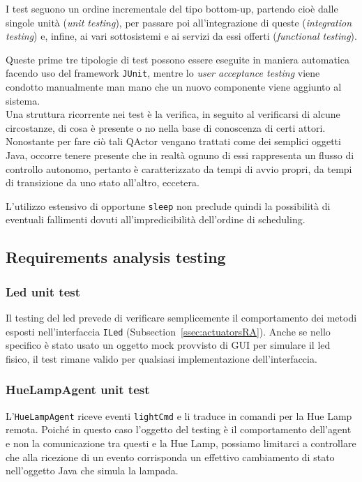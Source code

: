 \documentclass{../llncs}
\newcommand{\codescript}[1]{{\mbox{\small{\texttt{#1}}}}\xspace}
\newcommand{\xss}[1]{\subsectionname~\ref{ssec:#1}}
\newcommand{\labelsssec}[1]{\label{sssec:#1}}
\newcommand{\subsectionname}{Subsection}
\begin{document}
I test seguono un ordine incrementale del tipo bottom-up, partendo cioè dalle singole unità (\emph{unit testing}), per passare poi all'integrazione di queste (\emph{integration testing}) e, infine, ai vari sottosistemi e ai servizi da essi offerti (\emph{functional testing}).

Queste prime tre tipologie di test possono essere eseguite in maniera automatica facendo uso del framework \texttt{JUnit}, mentre lo \emph{user acceptance testing} viene condotto manualmente man mano che un nuovo componente viene aggiunto al sistema.\\

Una struttura ricorrente nei test è la verifica, in seguito al verificarsi di alcune circostanze, di cosa è presente o no nella base di conoscenza di certi attori. Nonostante per fare ciò tali QActor vengano trattati come dei semplici oggetti Java, occorre tenere presente che in realtà ognuno di essi rappresenta un flusso di controllo autonomo, pertanto è caratterizzato da tempi di avvio propri, da tempi di transizione da uno stato all'altro, eccetera.

L'utilizzo estensivo di opportune \codescript{sleep} non preclude quindi la possibilità di eventuali fallimenti dovuti all'impredicibilità dell'ordine di scheduling.

\subsection{Requirements analysis testing}
\labelsssec{reqAnalTesting}

\subsubsection{Led unit test}
Il testing del led prevede di verificare semplicemente il comportamento dei metodi esposti nell'interfaccia \codescript{ILed} (\xss{actuatorsRA}). Anche se nello specifico è stato usato un oggetto mock provvisto di GUI per simulare il led fisico, il test rimane valido per qualsiasi implementazione dell'interfaccia.\\



\subsubsection{HueLampAgent unit test}
L'\codescript{HueLampAgent} riceve eventi \codescript{lightCmd} e li traduce in comandi per la Hue Lamp remota. Poiché in questo caso l'oggetto del testing è il comportamento dell'agent e non la comunicazione tra questi e la Hue Lamp, possiamo limitarci a controllare che alla ricezione di un evento corrisponda un effettivo cambiamento di stato nell'oggetto Java che simula la lampada.\\
\end{document}
